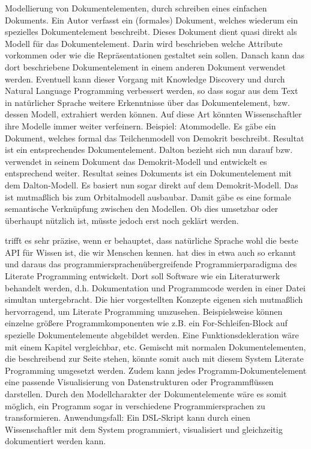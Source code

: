  
Modellierung von Dokumentelementen, durch schreiben eines einfachen Dokuments. Ein Autor verfasst ein (formales) Dokument, welches wiederum ein spezielles Dokumentelement beschreibt. Dieses Dokument dient quasi direkt als Modell für das Dokumentelement. Darin wird beschrieben welche Attribute vorkommen oder wie die Repräsentationen gestaltet sein sollen. Danach kann das dort beschriebene Dokumentelement in einem anderen Dokument verwendet werden. Eventuell kann dieser Vorgang mit Knowledge Discovery und durch Natural Language Programming verbessert werden, so dass sogar aus dem Text in natürlicher Sprache weitere Erkenntnisse über das Dokumentelement, bzw. dessen Modell, extrahiert werden können. Auf diese Art könnten Wissenschaftler ihre Modelle immer weiter verfeinern. Beispiel: Atommodelle. Es gäbe ein Dokument, welches formal das Teilchenmodell von Demokrit beschreibt. Resultat ist ein entsprechendes Dokumentelement. Dalton bezieht sich nun darauf bzw. verwendet in seinem Dokument das Demokrit-Modell und entwickelt es entsprechend weiter. Resultat seines Dokuments ist ein Dokumentelement mit dem Dalton-Modell. Es basiert nun sogar direkt auf dem Demokrit-Modell. Das ist mutmaßlich bis zum Orbitalmodell ausbaubar. Damit gäbe es eine formale semantische Verknüpfung zwischen den Modellen. Ob dies umsetzbar oder überhaupt nützlich ist, müsste jedoch erst noch geklärt werden.

 
\citep[S.~3]{Segaran} trifft es sehr präzise, wenn er behauptet, dass natürliche Sprache wohl die beste API für Wissen ist, die wir Menschen kennen. \citep[S.~1]{Knuth} hat dies in etwa auch so erkannt und daraus das programmiersprachenübergreifende Programmierparadigma des Literate Programming entwickelt. Dort soll Software wie ein Literaturwerk behandelt werden, d.h. Dokumentation und Programmcode werden in einer Datei simultan untergebracht. Die hier vorgestellten Konzepte eigenen sich mutmaßlich hervorragend, um Literate Programming umzusehen. Beispielsweise können einzelne größere Programmkomponenten wie z.B. ein For-Schleifen-Block auf spezielle Dokumentelemente abgebildet werden. Eine Funktionsdekleration wäre mit einem Kapitel vergleichbar, etc. Gemischt mit normalen Dokumentelementen, die beschreibend zur Seite stehen, könnte somit auch mit diesem System Literate Programming umgesetzt werden. Zudem kann jedes Programm-Dokumentelement eine passende Visualisierung von Datenstrukturen oder Programmflüssen darstellen. Durch den Modellcharakter der Dokumentelemente wäre es somit möglich, ein Programm sogar in verschiedene Programmiersprachen zu transformieren. Anwendungsfall: Ein DSL-Skript kann durch einen Wissenschaftler mit dem System programmiert, visualisiert und gleichzeitig dokumentiert werden kann.


